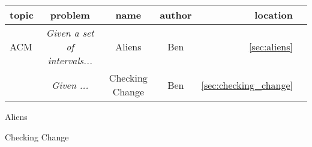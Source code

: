 \documentclass[a4paper, 11pt]{article}
\newcommand{\includecode}[1]{
    }
\begin{document}
    \begin{tabular}{ l  c  c  c  r  r}
        topic & problem & name & author & location\\
      \hline
        ACM & \textit{Given a set of intervals...} & Aliens & Ben & \ref{sec:aliens} \\
        & \textit{Given ...} & Checking Change & Ben & \ref{sec:checking_change} \\
    \end{tabular}

    \begin{section}{Aliens}
        \label{sec:aliens}
        \includecode{../problems/Aliens/Aliens1.cpp}
    \end{section}
    \begin{section}{Checking Change}
        \label{sec:checking_change}
        \includecode{../problems/Checking_Change/CheckingChangeBen.cpp}
    \end{section}
\end{document}
